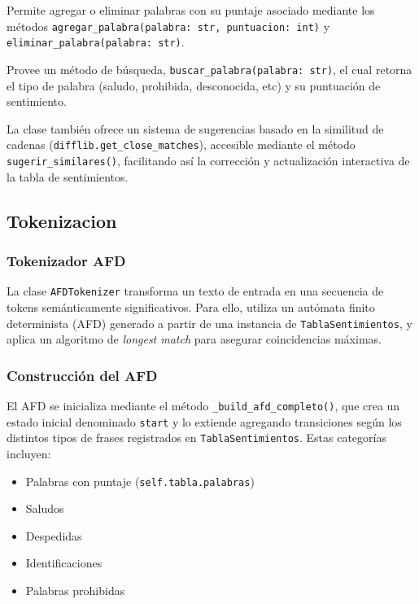 Permite agregar o eliminar palabras con su puntaje asociado mediante los métodos
\texttt{agregar\_palabra(palabra: str, puntuacion: int)} y \texttt{eliminar\_palabra(palabra: str)}.

Provee un método de búsqueda, \texttt{buscar\_palabra(palabra: str)}, el cual retorna el tipo
de palabra (saludo, prohibida, desconocida, etc) y su puntuación de sentimiento.

La clase también ofrece un sistema de sugerencias basado en la similitud de cadenas
(\texttt{difflib.get\_close\_matches}), accesible mediante el método
\texttt{sugerir\_similares()}, facilitando así la corrección y actualización interactiva de la
tabla de sentimientos.

\subsection{Tokenizacion}

\subsubsection{Tokenizador AFD}

La clase \texttt{AFDTokenizer} transforma un texto de entrada en una secuencia de tokens
semánticamente significativos. Para ello, utiliza un autómata finito determinista (AFD)
generado a partir de una instancia de \texttt{TablaSentimientos}, y aplica un algoritmo de
\textit{longest match} para asegurar coincidencias máximas.

\subsubsection{Construcción del AFD}

El AFD se inicializa mediante el método \texttt{\_build\_afd\_completo()}, que crea un estado
inicial denominado \texttt{start} y lo extiende agregando transiciones según los distintos
tipos de frases registrados en \texttt{TablaSentimientos}. Estas categorías incluyen:

\begin{itemize}
	\item Palabras con puntaje (\texttt{self.tabla.palabras})
	\item Saludos
	\item Despedidas
	\item Identificaciones
	\item Palabras prohibidas
\end{itemize}


